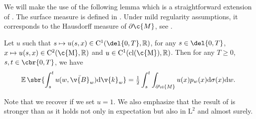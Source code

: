 We will make the use of the following lemma which is a straightforward extension of \textcite[Theorem 2.6]{burdzy2004heat}.
The surface measure is defined in \cite[Proposition 2.43]{lee2006riemannian}.
Under mild regularity assumptions, it corresponds to the Hausdorff measure of \(\partial \c{M}\), see \cite{evans2015measure}.

\begin{lemma}
	\label{lemma:formula_integration}
	Let \(u\) such that \(s \mapsto u(s,x) \in \mathrm{C}^1(\del{0,T}, \R)\), for any \(s \in \del{0,T}\), \(x \mapsto u(s,x) \in \mathrm{C}^2(\mathrm{\c{M}}, \R)\) and \(u \in \mathrm{C}^1(\mathrm{cl}(\mathrm{\c{M}}), \R)\).
	Then for any \(T \geq 0\), \(s, t \in \cbr{0,T}\), we have \begin{equation} {\E\sbr{\int_s^t u(w, \bar{\v{B}}_w) \mathrm{d} \v{k}_w } = \tfrac{1}{2} \int_s^t \int_{\partial \c{M}} u(x) p_w(x) \mathrm{d} \sigma(x) \mathrm{d} w .
		}
	\end{equation}
\end{lemma}

Note that we recover \textcite[Theorem 2.6]{burdzy2004heat} if we set \(u=1\).
We also emphasize that the result of \textcite[Theorem 2.6]{burdzy2004heat} is stronger than  as it holds not only in expectation but also in \(\mathrm{L}^2\) and almost surely.

